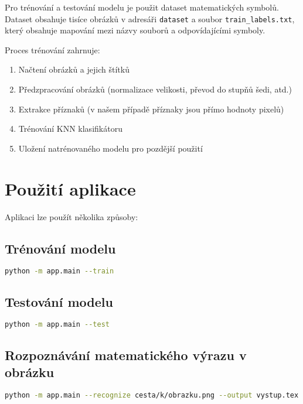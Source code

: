 Pro trénování a testování modelu je použit dataset matematických symbolů. Dataset obsahuje tisíce obrázků v adresáři \texttt{dataset} a soubor \texttt{train\_labels.txt}, který obsahuje mapování mezi názvy souborů a odpovídajícími symboly.

Proces trénování zahrnuje:
\begin{enumerate}
    \item Načtení obrázků a jejich štítků
    \item Předzpracování obrázků (normalizace velikosti, převod do stupňů šedi, atd.)
    \item Extrakce příznaků (v našem případě příznaky jsou přímo hodnoty pixelů)
    \item Trénování KNN klasifikátoru
    \item Uložení natrénovaného modelu pro pozdější použití
\end{enumerate}

\section{Použití aplikace}

Aplikaci lze použít několika způsoby:

\subsection{Trénování modelu}

\begin{lstlisting}[language=bash]
python -m app.main --train
\end{lstlisting}

\subsection{Testování modelu}

\begin{lstlisting}[language=bash]
python -m app.main --test
\end{lstlisting}

\subsection{Rozpoznávání matematického výrazu v obrázku}

\begin{lstlisting}[language=bash]
python -m app.main --recognize cesta/k/obrazku.png --output vystup.tex
\end{lstlisting}

